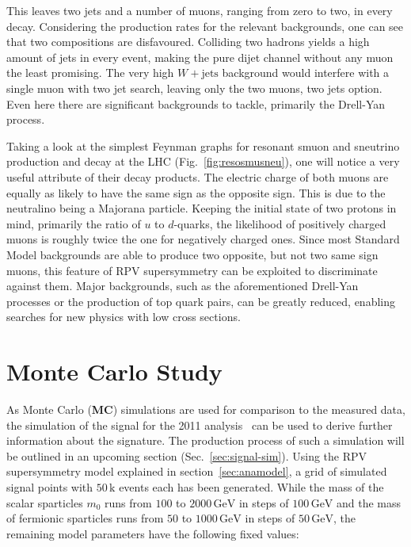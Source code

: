 This leaves two jets and a number of muons, ranging from zero to two, in every decay. Considering the production rates for the relevant backgrounds, one can see that two compositions are disfavoured. Colliding two hadrons yields a high amount of jets in every event, making the pure dijet channel without any muon the least promising. The very high $W + \text{jets}$ background would interfere with a single muon with two jet search, leaving only the two muons, two jets option. Even here there are significant backgrounds to tackle, primarily the Drell-Yan process.

Taking a look at the simplest Feynman graphs for resonant smuon and sneutrino production and decay at the LHC (Fig.~\ref{fig:resosmusneu}), one will notice a very useful attribute of their decay products. The electric charge of both muons are equally as likely to have the same sign as the opposite sign. This is due to the neutralino being a Majorana particle. Keeping the initial state of two protons in mind, primarily the ratio of $u$ to $d$-quarks, the likelihood of positively charged muons is roughly twice the one for negatively charged ones. Since most Standard Model backgrounds are able to produce two opposite, but not two same sign muons, this feature of RPV supersymmetry can be exploited to discriminate against them. Major backgrounds, such as the aforementioned Drell-Yan processes or the production of top quark pairs, can be greatly reduced, enabling searches for new physics with low cross sections.


\section{Monte Carlo Study}
\label{sec:mcstudy}

As Monte Carlo (\textbf{MC}) simulations are used for comparison to the measured data, the simulation of the signal for the 2011 analysis~\cite{2011rpv} can be used to derive further information about the signature. The production process of such a simulation will be outlined in an upcoming section (Sec.~\ref{sec:signal-sim}). Using the RPV supersymmetry model explained in section~\ref{sec:anamodel}, a grid of simulated signal points with $50\,\text{k}$ events each has been generated. While the mass of the scalar sparticles $m_0$ runs from $100$ to $2000\,\text{GeV}$ in steps of $100\,\text{GeV}$ and the mass of fermionic sparticles runs from $50$ to $1000\,\text{GeV}$ in steps of $50\,\text{GeV}$, the remaining model parameters have the following fixed values:

